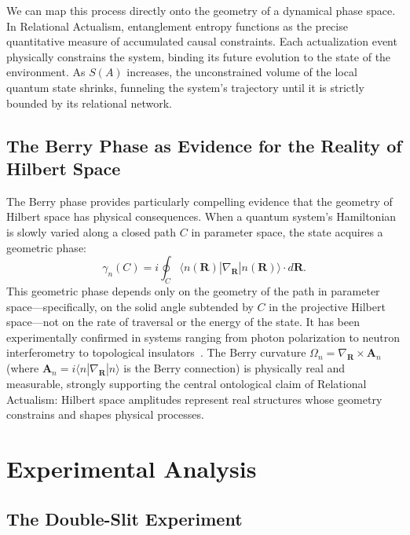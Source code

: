 \documentclass[11pt,a4paper]{article}
\theoremstyle{plain}
\theoremstyle{definition}
\theoremstyle{remark}
\newcommand{\ket}[1]{|#1\rangle}
\newcommand{\bra}[1]{\langle #1|}
\begin{document}
We can map this process directly onto the geometry of a dynamical phase space. In
Relational Actualism, entanglement entropy functions as the precise quantitative
measure of accumulated causal constraints. Each actualization event physically
constrains the system, binding its future evolution to the state of the
environment. As $S(A)$ increases, the unconstrained volume of the local quantum
state shrinks, funneling the system's trajectory until it is strictly bounded by
its relational network.

\subsection{The Berry Phase as Evidence for the Reality of Hilbert Space}

The Berry phase provides particularly compelling evidence that the geometry of
Hilbert space has physical consequences. When a quantum system's Hamiltonian is
slowly varied along a closed path $C$ in parameter space, the state acquires a
geometric phase:
\begin{equation}
  \gamma_n(C) = i \oint_C \bra{n(\mathbf{R})}\nabla_{\mathbf{R}}\ket{n(\mathbf{R})}
  \cdot d\mathbf{R}.
\end{equation}
This geometric phase depends only on the geometry of the path in parameter
space---specifically, on the solid angle subtended by $C$ in the projective
Hilbert space---not on the rate of traversal or the energy of the state. It has
been experimentally confirmed in systems ranging from photon polarization to
neutron interferometry to topological insulators~\citep{Cohen2019}. The Berry
curvature $\Omega_n = \nabla_{\mathbf{R}} \times \mathbf{A}_n$ (where
$\mathbf{A}_n = i\bra{n}\nabla_{\mathbf{R}}\ket{n}$ is the Berry connection) is
physically real and measurable, strongly supporting the central ontological claim
of Relational Actualism: Hilbert space amplitudes represent real structures whose
geometry constrains and shapes physical processes.

\section{Experimental Analysis}
\label{sec:experiment}

\subsection{The Double-Slit Experiment}
\end{document}
